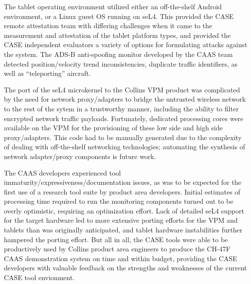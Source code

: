 The tablet operating environment utilized either an off-the-shelf Android environment, or a Linux
guest OS running on seL4. This provided the CASE remote attestation team with differing challenges
when it came to the measurement and attestation of the tablet platform types, and provided the CASE
independent evaluators a variety of options for formulating attacks against the system. The ADS-B
anti-spoofing monitor developed by the CAAS team detected position/velocity trend inconsistencies,
duplicate traffic identifiers, as well as ``teleporting'' aircraft.

The port of the seL4 microkernel to the Collins VPM product was complicated by the need for network
proxy/adapters to bridge the untrusted wireless network to the rest of the sytem in a trustworthy
manner, including the ability to filter encrypted network traffic payloads. Fortunately, dedicated
processing cores were available on the VPM for the provisioning of these low side and high side
proxy/adapters. This code had to be manually generated due to the complexity of dealing with
off-the-shelf networking technologies; automating the synthesis of network adapter/proxy components
is future work.

The CAAS developers experienced tool immaturity/expressiveness/documentation issues, as was to be
expected for the first use of a research tool suite by product area developers. Initial estimates of
processing time required to run the monitoring components turned out to be overly optimistic,
requiring an optimization effort. Lack of detailed seL4 support for the target hardware led to more
extensive porting efforts for the VPM and tablets than was originally anticipated, and tablet
hardware instabilities further hampered the porting effort. But all in all, the CASE tools were able
to be productively used by Collins product area engineers to produce the CH-47F CAAS demonstration
system on time and within budget, providing the CASE developers with valuable feedback on the
strengths and weaknesses of the current CASE tool envionment.
